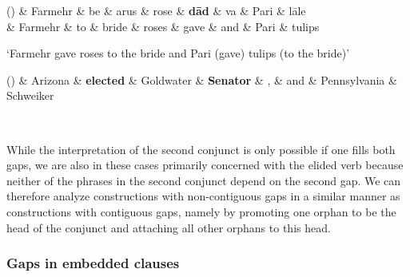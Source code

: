 \documentclass[lucida,biblatex]{sp} %
\newcounter{excounter}
\begin{document}
\begin{center}
  \label{ex:persian-gap-1}
  \footnotesize
  \begin{dependency}
    \begin{deptext}
      (\theexcounter) 
     \& Farmehr \& be \& arus \& rose \& \textbf{d\={a}d} \& va \& Pari \& l\={a}le \\
      \&         Farmehr  \& to  \& bride \& roses \& gave \& and \& Pari \& tulips \\
    \end{deptext}
  \end{dependency}
  \trans `Farmehr gave roses to the bride and Pari (gave) tulips (to the bride)' \\ \normalsize \null \hfill \citep{Farudi2013}
\end{center}

\begin{center}
  \label{ex:en-gap-6}
  \footnotesize
  \begin{dependency}
    \begin{deptext}
      (\theexcounter) 
      \& Arizona \& \textbf{elected} \& Goldwater \& \textbf{Senator} \& , \& and \& Pennsylvania \& Schweiker \\
    \end{deptext}
  \end{dependency}
  \\ \normalsize \null \hfill \citep{Jackendoff1971}
\end{center}



While the interpretation of the second conjunct is only possible if one fills both gaps, 
we are also in these cases primarily concerned with the elided verb because neither 
of the phrases in the second conjunct depend on the second gap. We can therefore 
analyze constructions with non-contiguous gaps in a similar manner as constructions 
with contiguous gaps, namely by promoting one orphan to be the head of the conjunct 
and attaching all other orphans to this head. 

\subsubsection{Gaps in embedded clauses}
\end{document}
